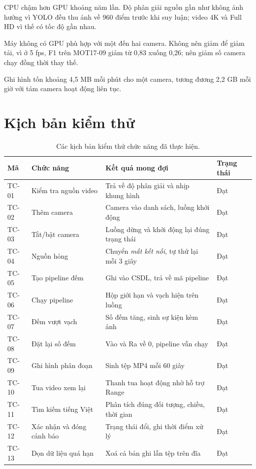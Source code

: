 CPU chậm hơn GPU khoảng năm lần. Độ phân giải nguồn gần như không ảnh hưởng vì YOLO
đều thu ảnh về 960 điểm trước khi suy luận; video 4K và Full HD vì thế có tốc độ gần
nhau.

Máy không có GPU phù hợp với một đến hai camera. Không nên giảm  để
giảm tải, vì ở 5 fps, F1 trên MOT17-09 giảm từ 0{,}83 xuống 0{,}26; nên giảm số camera
chạy đồng thời thay thế.

Ghi hình tốn khoảng 4,5 MB mỗi phút cho một camera, tương đương 2,2 GB mỗi giờ với tám
camera hoạt động liên tục.

\section{Kịch bản kiểm thử}
\label{sec:kiemthu}

\begin{table}[H]
\centering
\caption{Các kịch bản kiểm thử chức năng đã thực hiện.}
\label{tab:testcase}
\small
\begin{tabularx}{\textwidth}{@{}llXl@{}}
\toprule
\textbf{Mã} & \textbf{Chức năng} & \textbf{Kết quả mong đợi} & \textbf{Trạng thái} \\
\midrule
TC-01 & Kiểm tra nguồn video & Trả về độ phân giải và nhịp khung hình & Đạt \\
TC-02 & Thêm camera & Camera vào danh sách, luồng khởi động & Đạt \\
TC-03 & Tắt/bật camera & Luồng dừng và khởi động lại đúng trạng thái & Đạt \\
TC-04 & Nguồn hỏng & Chuyển \emph{mất kết nối}, tự thử lại mỗi 3 giây & Đạt \\
TC-05 & Tạo pipeline đếm & Ghi vào CSDL, trả về mã pipeline & Đạt \\
TC-06 & Chạy pipeline & Hộp giới hạn và vạch hiện trên luồng & Đạt \\
TC-07 & Đếm vượt vạch & Số đếm tăng, sinh sự kiện kèm ảnh & Đạt \\
TC-08 & Đặt lại số đếm & Vào và Ra về 0, pipeline vẫn chạy & Đạt \\
TC-09 & Ghi hình phân đoạn & Sinh tệp MP4 mỗi 60 giây & Đạt \\
TC-10 & Tua video xem lại & Thanh tua hoạt động nhờ hỗ trợ Range & Đạt \\
TC-11 & Tìm kiếm tiếng Việt & Phân tích đúng đối tượng, chiều, thời gian & Đạt \\
TC-12 & Xác nhận và đóng cảnh báo & Trạng thái đổi, ghi thời điểm xử lý & Đạt \\
TC-13 & Dọn dữ liệu quá hạn & Xoá cả bản ghi lẫn tệp trên đĩa & Đạt \\

\end{tabularx}
\end{table}
